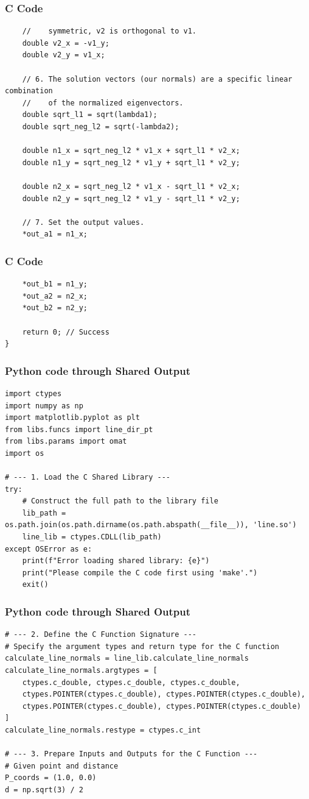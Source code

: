 \documentclass{beamer}
\begin{document}
\begin{frame}[fragile]
\frametitle{C Code }
\begin{lstlisting}
    //    symmetric, v2 is orthogonal to v1.
    double v2_x = -v1_y;
    double v2_y = v1_x;

    // 6. The solution vectors (our normals) are a specific linear combination
    //    of the normalized eigenvectors.
    double sqrt_l1 = sqrt(lambda1);
    double sqrt_neg_l2 = sqrt(-lambda2);

    double n1_x = sqrt_neg_l2 * v1_x + sqrt_l1 * v2_x;
    double n1_y = sqrt_neg_l2 * v1_y + sqrt_l1 * v2_y;
    
    double n2_x = sqrt_neg_l2 * v1_x - sqrt_l1 * v2_x;
    double n2_y = sqrt_neg_l2 * v1_y - sqrt_l1 * v2_y;

    // 7. Set the output values.
    *out_a1 = n1_x;
\end{lstlisting}    
\end{frame}
\begin{frame}[fragile]
\frametitle{C Code }
\begin{lstlisting}
    *out_b1 = n1_y;
    *out_a2 = n2_x;
    *out_b2 = n2_y;

    return 0; // Success
}
\end{lstlisting}    
\end{frame}
\begin{frame}[fragile]
\frametitle{Python code through Shared Output }
\begin{lstlisting}
import ctypes
import numpy as np
import matplotlib.pyplot as plt
from libs.funcs import line_dir_pt
from libs.params import omat
import os

# --- 1. Load the C Shared Library ---
try:
    # Construct the full path to the library file
    lib_path = os.path.join(os.path.dirname(os.path.abspath(__file__)), 'line.so')
    line_lib = ctypes.CDLL(lib_path)
except OSError as e:
    print(f"Error loading shared library: {e}")
    print("Please compile the C code first using 'make'.")
    exit()
\end{lstlisting}    
\end{frame}
\begin{frame}[fragile]
\frametitle{Python code through Shared Output }
\begin{lstlisting}
# --- 2. Define the C Function Signature ---
# Specify the argument types and return type for the C function
calculate_line_normals = line_lib.calculate_line_normals
calculate_line_normals.argtypes = [
    ctypes.c_double, ctypes.c_double, ctypes.c_double,
    ctypes.POINTER(ctypes.c_double), ctypes.POINTER(ctypes.c_double),
    ctypes.POINTER(ctypes.c_double), ctypes.POINTER(ctypes.c_double)
]
calculate_line_normals.restype = ctypes.c_int

# --- 3. Prepare Inputs and Outputs for the C Function ---
# Given point and distance
P_coords = (1.0, 0.0)
d = np.sqrt(3) / 2
\end{lstlisting}    
\end{frame}
\end{document}
